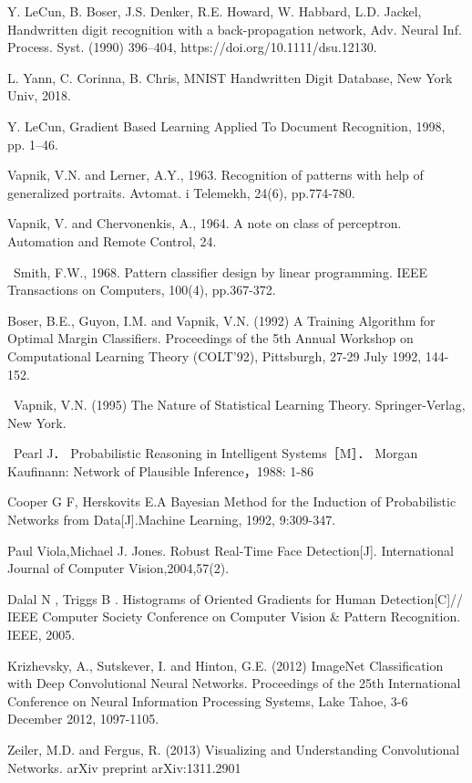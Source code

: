\documentclass[15pt]{article}
\begin{document}
\begin{thebibliography}{99}
 Y. LeCun, B. Boser, J.S. Denker, R.E. Howard, W. Habbard, L.D. Jackel, Handwritten digit recognition with a back-propagation network, Adv. Neural Inf. Process. Syst. (1990) 396–404, https://doi.org/10.1111/dsu.12130.

 L. Yann, C. Corinna, B. Chris, MNIST Handwritten Digit Database, New York Univ, 2018.

 Y. LeCun, Gradient Based Learning Applied To Document Recognition, 1998, pp. 1–46.

 Vapnik, V.N. and Lerner, A.Y., 1963. Recognition of patterns with help of generalized portraits. Avtomat. i Telemekh, 24(6), pp.774-780.

 Vapnik, V. and Chervonenkis, A., 1964. A note on class of perceptron. Automation and Remote Control, 24.

 Smith, F.W., 1968. Pattern classifier design by linear programming. IEEE Transactions on Computers, 100(4), pp.367-372.

Boser, B.E., Guyon, I.M. and Vapnik, V.N. (1992) A Training Algorithm for Optimal Margin Classifiers. Proceedings of the 5th Annual Workshop on Computational Learning Theory (COLT’92), Pittsburgh, 27-29 July 1992, 144-152.

 Vapnik, V.N. (1995) The Nature of Statistical Learning Theory. Springer-Verlag, New York.

 Pearl J． Probabilistic Reasoning in Intelligent Systems［M］． Morgan Kaufinann: Network of Plausible Inference，1988: 1-86

 Cooper G F, Herskovits E.A Bayesian Method for the Induction of Probabilistic Networks from Data[J].Machine Learning, 1992, 9:309-347.

 Paul Viola,Michael J. Jones. Robust Real-Time Face Detection[J]. International Journal of Computer Vision,2004,57(2).

 Dalal N , Triggs B . Histograms of Oriented Gradients for Human Detection[C]// IEEE Computer Society Conference on Computer Vision \& Pattern Recognition. IEEE, 2005.

 Krizhevsky, A., Sutskever, I. and Hinton, G.E. (2012) ImageNet Classification with Deep Convolutional Neural Networks. Proceedings of the 25th International Conference on Neural Information Processing Systems, Lake Tahoe, 3-6 December 2012, 1097-1105.

 Zeiler, M.D. and Fergus, R. (2013) Visualizing and Understanding Convolutional Networks. arXiv preprint arXiv:1311.2901


\end{thebibliography}
\end{document}
